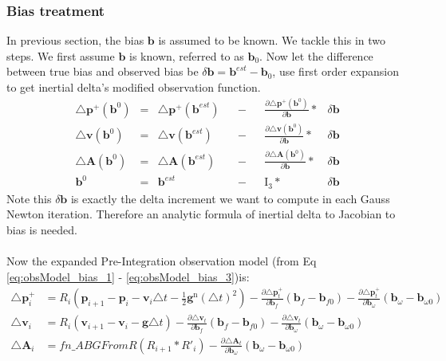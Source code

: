 \documentclass[12pt]{article}   %
\begin{document}
\subsubsection{Bias treatment}
In previous section, the bias $\bm{b}$ is assumed to be known. We tackle this in two steps. We first assume $\bm{b}$ is known, referred to as $\bm{b}_0$. Now let the difference between true bias and observed bias be $\delta \bm{b} = \bm{b}^{est} - \bm{b}_0$, use first order expansion to get inertial delta's modified observation function.
\begin{align}
\triangle \bm{p}^+(\bm{b}^{0}) &=& \triangle \bm{p}^+(\bm{b}^{est})& &- & &\frac{\partial {\triangle \bm{p}^+(\bm{b}^{0})}}{\partial \bm{b}}  *&\delta \bm{b} 
\label{eq:obsModel_bias_1}\\
\triangle \bm{v}(\bm{b}^{0}) &=& \triangle \bm{v}(\bm{b}^{est})& &- & & \frac{\partial {\triangle \bm{v}(\bm{b}^{0})}}{\partial \bm{b}}*& \delta \bm{b} 
\label{eq:obsModel_bias_2}\\
\triangle \bm{A}(\bm{b}^{0}) &=& \triangle \bm{A}(\bm{b}^{est})& &- & &\frac{\partial {\triangle \bm{A}(\bm{b}^{0})}}{\partial \bm{b}}*& \delta \bm{b}
\label{eq:obsModel_bias_3}\\
\bm{b}^{0} &=& \bm{b}^{est}& &- & & \bm{\mathrm I}_3*&\delta \bm{b}
\end{align}
Note this $\delta \bm{b}$ is exactly the delta increment we want to compute in each Gauss Newton iteration. Therefore an analytic formula of inertial delta to Jacobian to bias is needed.\\ \\
Now the expanded Pre-Integration observation model (from Eq \ref{eq:obsModel_bias_1} - \ref{eq:obsModel_bias_3})is:
\begin{align}
%
\triangle \textbf{p}^+_i &= R_i (\textbf{p}_{i+1} - \textbf{p}_i - \textbf{v}_i \triangle t - \frac{1}{2} \textbf{g}^{\mathrm{n}} {(\triangle t)}^2) - \frac{\partial \triangle \textbf{p}^+_t}{\partial \textbf{b}_f} (\textbf{b}_f - \textbf{b}_{f0}) -  \frac{\partial \triangle \textbf{p}^+_t}{\partial \textbf{b}_\omega} (\textbf{b}_\omega - \textbf{b}_{\omega0})
\label{eqn:preintObsModel_1} \\
%
\triangle  \textbf{v}_i &= R_i (\textbf{v}_{i+1} - \textbf{v}_i - \textbf{g} \triangle t) - \frac{\partial \triangle \textbf{v}_t}{\partial \textbf{b}_f} (\textbf{b}_f - \textbf{b}_{f0}) -  \frac{\partial \triangle \textbf{v}_t}{\partial \textbf{b}_\omega} (\textbf{b}_\omega - \textbf{b}_{\omega0})
\label{eqn:preintObsModel_2} \\
%
\triangle \textbf{A}_i &= fn\_ABGFromR(R_{i+1}*R'_{i}) - \frac{\partial \triangle \textbf{A}_t}{\partial \textbf{b}_\omega} (\textbf{b}_\omega - \textbf{b}_{\omega0})
\label{eqn:preintObsModel_3}
\end{align}
\end{document}
